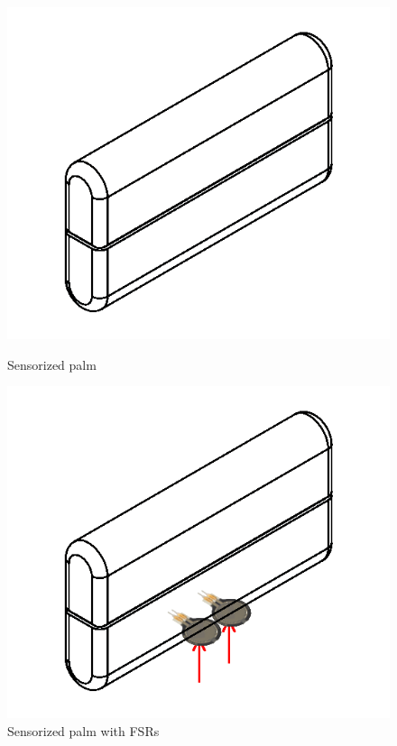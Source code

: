 \begin{figure}[h]
  \centering
  \begin{minipage}[b]{0.4\textwidth}
    \includegraphics[width=\textwidth]{Figure/dummipalm.png}
    \caption{Sensorized palm}
  \label{fig:dummi}
  \end{minipage}
  \hfill
  \begin{minipage}[b]{0.4\textwidth}
    \includegraphics[width=\textwidth]{Figure/dummipalmside.png}
    \caption{Sensorized palm with FSRs}
    \label{fig:dummifsr}
  \end{minipage}
\end{figure}



